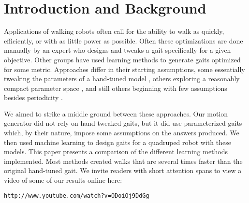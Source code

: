 \section{Introduction and Background}








Applications of walking robots often call for the ability to walk as
quickly, efficiently, or with as little power as possible.  Often
these optimizations are done manually by an expert who designs and
tweaks a gait specifically for a given objective.  Other groups have
used learning methods to generate gaits optimized for some metric.
Approaches differ in their starting assumptions, some essentially
tweaking the parameters of a hand-tuned model \cite{chernova}, others
exploring a reasonably compact parameter space \cite{kohl}, and still
others beginning with few assumptions besides periodicity
\cite{zykov}.

We aimed to strike a middle ground between these approaches.  Our
motion generator did not rely on hand-tweaked gaits, but it did use
parameterized gaits which, by their nature, impose some assumptions on
the answers produced.  We then used machine learning to design gaits
for a quadruped robot with these models.  This paper presents a
comparison of the different learning methods implemented.  Most
methods created walks that are several times faster than the original
hand-tuned gait.  We invite readers with short attention spans to view
a video of some of our results online here:

\texttt{http://www.youtube.com/watch?v=ODoiOj9DdGg}

